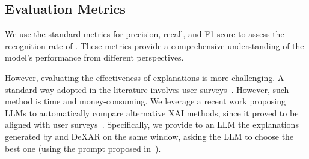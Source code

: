 

\subsection{Evaluation Metrics}

We use the standard metrics for precision, recall, and F1 score to assess the recognition rate of \acronym{}. 
These metrics provide a comprehensive understanding of the model's performance from different perspectives.


However, evaluating the effectiveness of explanations is more challenging. A standard way adopted in the literature involves user surveys~\cite{arrotta2022dexar,das2023explainable,jeyakumar2023x}. However, such method is time and money-consuming.
We leverage a recent work proposing LLMs to automatically compare alternative XAI methods, since it proved to be aligned with user surveys~\cite{fiori2024using}.
Specifically, we provide to an LLM the explanations generated by \acronym{} and DeXAR on the same window, asking the LLM to choose the best one (using the prompt proposed in~\cite{fiori2024using}).



